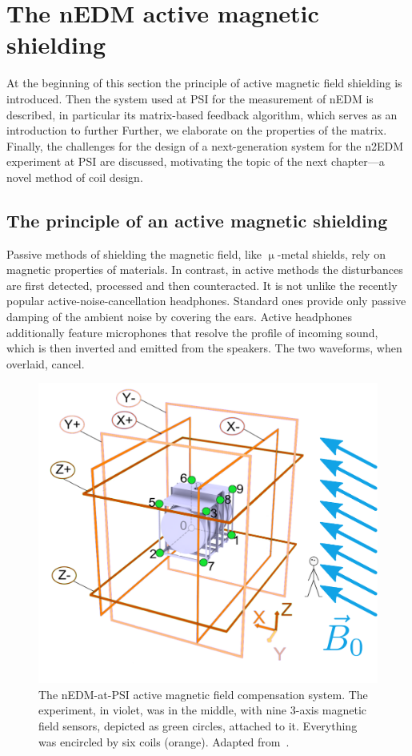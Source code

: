 \chapter{The nEDM active magnetic shielding}

\label{ch:nedm_sfc}

At the beginning of this section the principle of active magnetic field shielding is introduced. Then the system used at PSI for the measurement of nEDM is described, in particular its matrix-based feedback algorithm, which serves as an introduction to further Further, we elaborate on the properties of the matrix. Finally, the challenges for the design of a next-generation system for the n2EDM experiment at PSI are discussed, motivating the topic of the next chapter---a novel method of coil design.


\section{The principle of an active magnetic shielding}
Passive methods of shielding the magnetic field, like $\upmu$-metal shields, rely on magnetic properties of materials. In contrast, in active methods the disturbances are first detected, processed and then counteracted. It is not unlike the recently popular active-noise-cancellation headphones. Standard ones provide only passive damping of the ambient noise by covering the ears. Active headphones additionally feature microphones that resolve the profile of incoming sound, which is then inverted and emitted from the speakers. The two waveforms, when overlaid, cancel.

\begin{figure}
  \centering
  \includegraphics[width=0.7\linewidth]{gfx/nEDM_SFC/SFCplain.pdf}
  \caption{The nEDM-at-PSI active magnetic field compensation system. The experiment, in violet, was in the middle, with nine 3-axis magnetic field sensors, depicted as green circles, attached to it. Everything was encircled by six coils (orange). Adapted from~\cite{Franke2013}.}\label{fig:sfc-scheme}
\end{figure}

